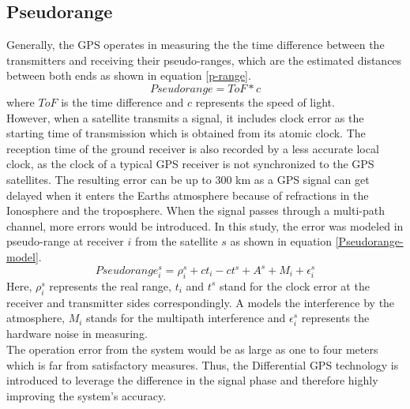 \documentclass[journal,onecolumn]{IEEEtran}
\begin{document}
\subsection{Pseudorange}
Generally, the GPS operates in measuring the the time difference between the transmitters and receiving their pseudo-ranges,
which are the estimated distances between both ends as shown in equation \ref{p-range}.
\begin{equation}
  Pseudorange = ToF * c
  \label{p-range}
\end{equation}
where $ToF$ is the time difference and $c$ represents the speed of light.\\
However, when a satellite transmits a signal, it includes clock error as the starting time of transmission which is obtained from its
atomic clock. The reception time of the ground receiver is also recorded by a less accurate local clock, as the clock of a
typical GPS receiver is not synchronized to the GPS satellites. The resulting error can be up to 300 km as a GPS signal can get
delayed when it enters the Earths atmosphere because of refractions in the Ionosphere and the troposphere. When the signal passes
through a multi-path channel, more errors would be introduced. In this study, the error was modeled in pseudo-range at receiver $i$
from the satellite $s$ as shown in equation \ref{Pseudorange-model}.
\begin{equation}
  Pseudorange_i^s = \rho_i^s + ct_i - ct^s + A^s + M_i + \epsilon_i^s
  \label{Pseudorange-model}
\end{equation}
Here, $\rho_i^s$ represents the real range, $t_i$ and $t^s$ stand for the clock error at
the receiver and transmitter sides correspondingly. A models the interference by the
atmosphere, $M_i$ stands for the multipath interference and $\epsilon_i^s$ represents
the hardware noise in measuring.\\
The operation error from the system would be as large as one to four meters which is far from satisfactory measures. Thus, the Differential
GPS technology is introduced to leverage the difference in the signal phase and therefore highly improving the system's accuracy.\\
\end{document}

